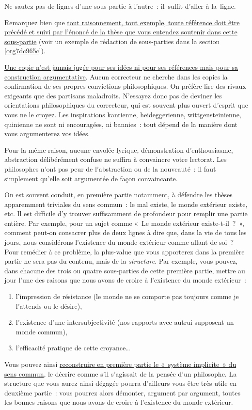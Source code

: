 \documentclass[a4paper,12pt]{report}
\begin{document}
Ne sautez pas de lignes d'une sous-partie à l'autre : il suffit d'aller
à la ligne.

Remarquez bien que \uline{tout raisonnement, tout exemple, toute référence
doit être précédé et suivi par l'énoncé de la thèse que vous entendez
soutenir dans cette sous-partie} (voir un exemple de rédaction de
sous-parties dans la section \ref{org7dc965c}).

\uline{Une copie n'est jamais jugée pour ses idées ni pour ses références mais
pour sa construction argumentative}. Aucun correcteur ne cherche dans
les copies la confirmation de ses propres convictions philosophiques. On
préfère lire des rivaux exigeants que des partisans maladroits.
N'essayez donc pas de deviner les orientations philosophiques du
correcteur, qui est souvent plus ouvert d'esprit que vous ne le croyez.
Les inspirations kantienne, heideggerienne, wittgensteinienne, quinienne
ne sont ni encouragées, ni bannies : tout dépend de la manière dont vous
argumenterez vos idées.

Pour la même raison, aucune envolée lyrique, démonstration
d'enthousiasme, abstraction délibérément confuse ne suffira à convaincre
votre lectorat. Les philosophes n'ont pas peur de l'abstraction ou de la
nouveauté : il faut simplement qu'elle soit argumentée de façon
convaincante.

On est souvent conduit, en première partie notamment, à défendre les
thèses apparemment triviales du sens commun : le mal existe, le monde
extérieur existe, etc. Il est difficile d'y trouver suffisamment de
profondeur pour remplir une partie entière. Par exemple, pour un sujet
comme « Le monde extérieur existe-t-il ? », comment peut-on consacrer
plus de deux lignes à dire que, dans la vie de tous les jours, nous
considérons l'existence du monde extérieur comme allant de soi ?
Pour remédier à ce problème, la plus-value que vous apporterez dans la
première partie ne sera pas du contenu, mais de la \emph{structure}. Par
exemple, vous pouvez, dans chacune des trois ou quatre sous-parties de
cette première partie, mettre au jour l'une des raisons que nous avons
de croire à l'existence du monde extérieur : 
\begin{enumerate}
\item l'impression de résistance (le monde ne se comporte pas toujours
comme je l'attends ou le désire),
\item l'existence d'une intersubjectivité (nos rapports avec autrui
supposent un monde commun),
\item l'efficacité pratique de cette croyance\ldots{}
\end{enumerate}
Vous pouvez ainsi \uline{reconstruire en première partie le « système
implicite » du sens commun}, le décrire comme s'il s'agissait de la
pensée d'un philosophe. La structure que vous aurez ainsi dégagée pourra
d'ailleurs vous être très utile en deuxième partie : vous pourrez alors
démonter, argument par argument, toutes les bonnes raisons que nous
avons de croire à l'existence du monde extérieur.
\end{document}
